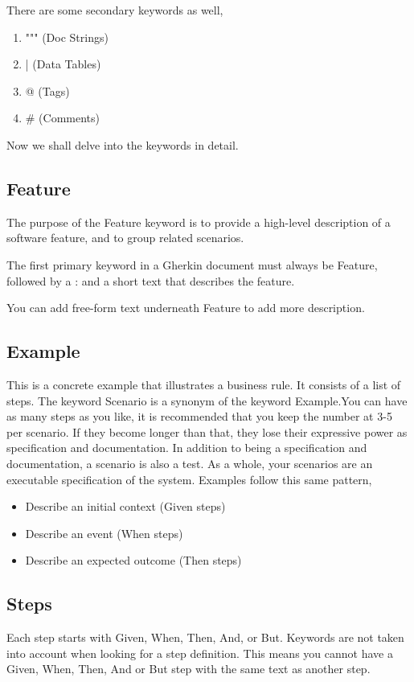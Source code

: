 \documentclass[conference]{IEEEtran}
\begin{document}
There are some secondary keywords as well,

\begin{enumerate}
	\item """ (Doc Strings)
	\item | (Data Tables)
	\item @ (Tags)
	\item \# (Comments)
\end{enumerate}

Now we shall delve into the keywords in detail.
\subsection{Feature}
The purpose of the Feature keyword is to provide a high-level description of a software feature, and to group related scenarios.

The first primary keyword in a Gherkin document must always be Feature, followed by a : and a short text that describes the feature.

You can add free-form text underneath Feature to add more description.\cite{a1}

\subsection{Example}
This is a concrete example that illustrates a business rule. It consists of a list of steps. The keyword Scenario is a synonym of the keyword Example.You can have as many steps as you like, it is recommended that you keep the number at 3-5 per scenario. If they become longer than that, they lose their expressive power as specification and documentation.\newline
In addition to being a specification and documentation, a scenario is also a test. As a whole, your scenarios are an executable specification of the system.\newline
Examples follow this same pattern, \cite{a1}
\begin{itemize}
	\item Describe an initial context (Given steps)
	\item Describe an event (When steps)
	\item Describe an expected outcome (Then steps)
\end{itemize}

\subsection{Steps}
Each step starts with Given, When, Then, And, or But. Keywords are not taken into account when looking for a step definition. This means you cannot have a Given, When, Then, And or But step with the same text as another step.
\end{document}
